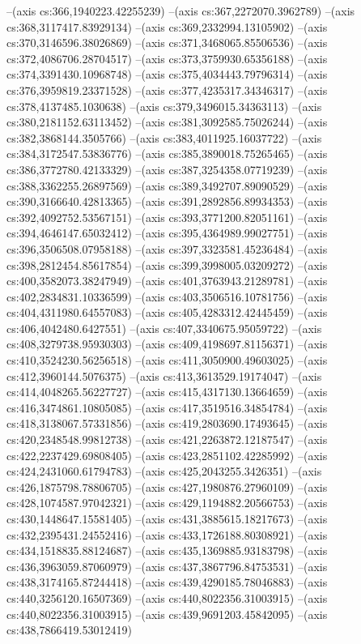 --(axis cs:366,1940223.42255239)
--(axis cs:367,2272070.3962789)
--(axis cs:368,3117417.83929134)
--(axis cs:369,2332994.13105902)
--(axis cs:370,3146596.38026869)
--(axis cs:371,3468065.85506536)
--(axis cs:372,4086706.28704517)
--(axis cs:373,3759930.65356188)
--(axis cs:374,3391430.10968748)
--(axis cs:375,4034443.79796314)
--(axis cs:376,3959819.23371528)
--(axis cs:377,4235317.34346317)
--(axis cs:378,4137485.1030638)
--(axis cs:379,3496015.34363113)
--(axis cs:380,2181152.63113452)
--(axis cs:381,3092585.75026244)
--(axis cs:382,3868144.3505766)
--(axis cs:383,4011925.16037722)
--(axis cs:384,3172547.53836776)
--(axis cs:385,3890018.75265465)
--(axis cs:386,3772780.42133329)
--(axis cs:387,3254358.07719239)
--(axis cs:388,3362255.26897569)
--(axis cs:389,3492707.89090529)
--(axis cs:390,3166640.42813365)
--(axis cs:391,2892856.89934353)
--(axis cs:392,4092752.53567151)
--(axis cs:393,3771200.82051161)
--(axis cs:394,4646147.65032412)
--(axis cs:395,4364989.99027751)
--(axis cs:396,3506508.07958188)
--(axis cs:397,3323581.45236484)
--(axis cs:398,2812454.85617854)
--(axis cs:399,3998005.03209272)
--(axis cs:400,3582073.38247949)
--(axis cs:401,3763943.21289781)
--(axis cs:402,2834831.10336599)
--(axis cs:403,3506516.10781756)
--(axis cs:404,4311980.64557083)
--(axis cs:405,4283312.42445459)
--(axis cs:406,4042480.6427551)
--(axis cs:407,3340675.95059722)
--(axis cs:408,3279738.95930303)
--(axis cs:409,4198697.81156371)
--(axis cs:410,3524230.56256518)
--(axis cs:411,3050900.49603025)
--(axis cs:412,3960144.5076375)
--(axis cs:413,3613529.19174047)
--(axis cs:414,4048265.56227727)
--(axis cs:415,4317130.13664659)
--(axis cs:416,3474861.10805085)
--(axis cs:417,3519516.34854784)
--(axis cs:418,3138067.57331856)
--(axis cs:419,2803690.17493645)
--(axis cs:420,2348548.99812738)
--(axis cs:421,2263872.12187547)
--(axis cs:422,2237429.69808405)
--(axis cs:423,2851102.42285992)
--(axis cs:424,2431060.61794783)
--(axis cs:425,2043255.3426351)
--(axis cs:426,1875798.78806705)
--(axis cs:427,1980876.27960109)
--(axis cs:428,1074587.97042321)
--(axis cs:429,1194882.20566753)
--(axis cs:430,1448647.15581405)
--(axis cs:431,3885615.18217673)
--(axis cs:432,2395431.24552416)
--(axis cs:433,1726188.80308921)
--(axis cs:434,1518835.88124687)
--(axis cs:435,1369885.93183798)
--(axis cs:436,3963059.87060979)
--(axis cs:437,3867796.84753531)
--(axis cs:438,3174165.87244418)
--(axis cs:439,4290185.78046883)
--(axis cs:440,3256120.16507369)
--(axis cs:440,8022356.31003915)
--(axis cs:440,8022356.31003915)
--(axis cs:439,9691203.45842095)
--(axis cs:438,7866419.53012419)
